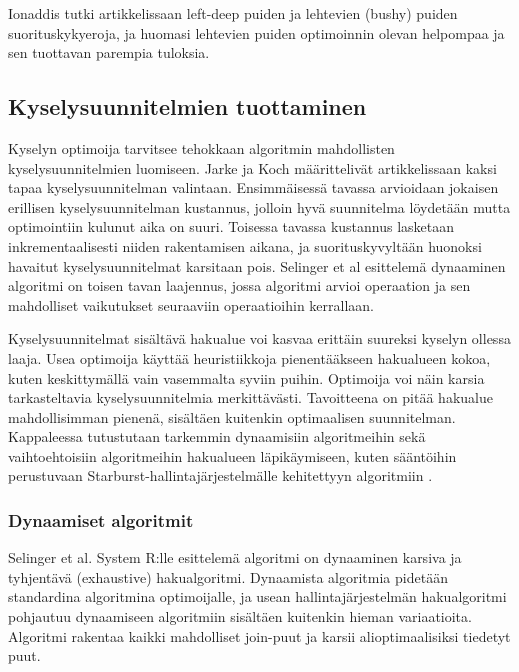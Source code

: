 \documentclass[finnish]{tktltiki2}
\theoremstyle{definition}
\theoremstyle{remark}
\begin{document}
Ionaddis tutki artikkelissaan \cite{ioannidis1991left} left-deep puiden ja lehtevien (bushy) puiden suorituskykyeroja, ja huomasi lehtevien puiden optimoinnin olevan helpompaa ja sen tuottavan parempia tuloksia. 


\subsection{Kyselysuunnitelmien tuottaminen}
Kyselyn optimoija tarvitsee tehokkaan algoritmin mahdollisten kyselysuunnitelmien luomiseen. Jarke ja Koch määrittelivät artikkelissaan \cite{jarke1984} kaksi tapaa kyselysuunnitelman valintaan. Ensimmäisessä tavassa arvioidaan jokaisen erillisen kyselysuunnitelman kustannus, jolloin hyvä suunnitelma löydetään mutta optimointiin kulunut aika on suuri. Toisessa tavassa kustannus lasketaan inkrementaalisesti niiden rakentamisen aikana, ja suorituskyvyltään huonoksi havaitut kyselysuunnitelmat karsitaan pois. Selinger et al esittelemä dynaaminen algoritmi \cite{selinger1979access} on toisen tavan laajennus, jossa algoritmi arvioi operaation ja sen mahdolliset vaikutukset seuraaviin operaatioihin kerrallaan.

Kyselysuunnitelmat sisältävä hakualue voi kasvaa erittäin suureksi kyselyn ollessa laaja. Usea optimoija käyttää heuristiikkoja pienentääkseen hakualueen kokoa, kuten keskittymällä vain vasemmalta syviin puihin. Optimoija voi näin karsia tarkasteltavia kyselysuunnitelmia merkittävästi. Tavoitteena on pitää hakualue mahdollisimman pienenä, sisältäen kuitenkin optimaalisen suunnitelman. \cite{jarke1984} Kappaleessa tutustutaan tarkemmin dynaamisiin algoritmeihin sekä vaihtoehtoisiin algoritmeihin hakualueen läpikäymiseen, kuten sääntöihin perustuvaan Starburst-hallintajärjestelmälle kehitettyyn algoritmiin \cite{lohman1988grammar}. 

\subsubsection{Dynaamiset algoritmit}
Selinger et al. System R:lle esittelemä algoritmi on dynaaminen karsiva ja tyhjentävä (exhaustive) hakualgoritmi. Dynaamista algoritmia pidetään standardina algoritmina optimoijalle, ja usean hallintajärjestelmän hakualgoritmi pohjautuu dynaamiseen algoritmiin sisältäen kuitenkin hieman variaatioita. Algoritmi rakentaa kaikki mahdolliset join-puut ja karsii alioptimaalisiksi tiedetyt puut.
\end{document}
